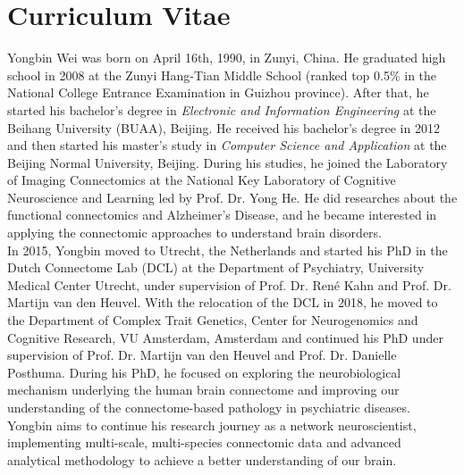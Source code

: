 \pagestyle{backmatter}

\chapter{Curriculum Vitae}
\label{ch: cv}

Yongbin Wei was born on April 16th, 1990, in Zunyi, China. He graduated high school in 2008 at the Zunyi Hang-Tian Middle School (ranked top 0.5\% in the National College Entrance Examination in Guizhou province). After that, he started his bachelor's degree in \textit{Electronic and Information Engineering} at the Beihang University (BUAA), Beijing. He received his bachelor's degree in 2012 and then started his master's study in \textit{Computer Science and Application} at the Beijing Normal University, Beijing. During his studies, he joined the Laboratory of Imaging Connectomics at the National Key Laboratory of Cognitive Neuroscience and Learning led by Prof. Dr. Yong He. He did researches about the functional connectomics and Alzheimer's Disease, and he became interested in applying the connectomic approaches to understand brain disorders. \\

In 2015, Yongbin moved to Utrecht, the Netherlands and started his PhD in the Dutch Connectome Lab (DCL) at the Department of Psychiatry, University Medical Center Utrecht, under supervision of Prof. Dr. René Kahn and Prof. Dr. Martijn van den Heuvel. With the relocation of the DCL in 2018, he moved to the Department of Complex Trait Genetics, Center for Neurogenomics and Cognitive Research, VU Amsterdam, Amsterdam and continued his PhD under supervision of Prof. Dr. Martijn van den Heuvel and Prof. Dr. Danielle Posthuma. During his PhD, he focused on exploring the neurobiological mechanism underlying the human brain connectome and improving our understanding of the connectome-based pathology in psychiatric diseases. Yongbin aims to continue his research journey as a network neuroscientist, implementing multi-scale, multi-species connectomic data and advanced analytical methodology to achieve a better understanding of our brain.










   

